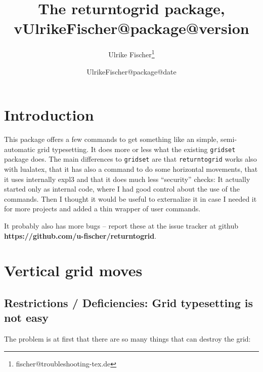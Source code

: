 \documentclass[twoside,parskip=half-,fontsize=12pt,egregdoesnotlikesansseriftitles,headings=normal]{scrartcl}
\title{The returntogrid package, v\csname UlrikeFischer@package@version\endcsname}
\date{\csname UlrikeFischer@package@date\endcsname}
\author{Ulrike Fischer\thanks{fischer@troubleshooting-tex.de}}
\begin{document}
\maketitle


\section{Introduction}

This package offers a few commands to get something like an simple, semi-automatic grid typesetting. It does more or less what the existing \texttt{gridset} package does. The main differences to \texttt{gridset} are that \texttt{returntogrid} works also with lualatex, that it has also a command to do some horizontal movements, that it uses internally expl3 and that it does much less \enquote{security} checks: It actually started only as internal code, where I had good control about the use of the commands. Then I thought it would be useful to externalize it in case I needed it for more projects and added a thin wrapper of user commands.

It probably also has more bugs -- report these  at the issue tracker at github \\ \textbf{https://github.com/u-fischer/returntogrid}.

\section{Vertical grid moves}

\subsection{Restrictions / Deficiencies:  Grid typesetting is not easy}


The problem is at first that there are so many things that can destroy the grid:
\end{document}
